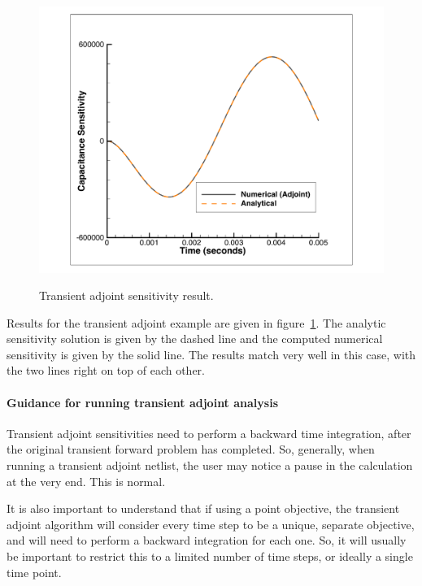 \begin{figure}[ht]
  \centering
  \scalebox{0.5}
  {\includegraphics[]{sensCapGearAdj}}
  \caption[Transient adjoint sensitivity result]
  {Transient adjoint sensitivity result.
\label{transientAdjointSensitivityResult}}
\end{figure}
Results for the transient adjoint example are given in 
figure~\ref{transientAdjointSensitivityResult}.  The
analytic sensitivity solution is given by the dashed line and the
computed numerical sensitivity is given by the solid line.  The
results match very well in this case, with the two lines right on top
of each other.

\paragraph{Guidance for running transient adjoint analysis}
Transient adjoint sensitivities need to perform a backward time integration, 
after the original transient forward problem has completed.    So, generally, 
when running a transient adjoint netlist, the user may notice a pause in the 
calculation at the very end.  This is normal.

It is also important to understand that if using a point objective, the 
transient adjoint algorithm will consider every time step to be a unique, 
separate objective, and will need to perform a backward integration for each one.  
So, it will usually be important to restrict this to a limited number of time 
steps, or ideally a single time point.

